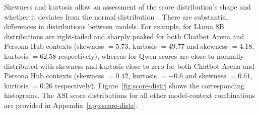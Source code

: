 \documentclass{DESSThesis}
\begin{document}
Skewness and kurtosis allow an assessment of the score distribution's shape and whether it deviates from the normal distribution~\cite{moosbrugger_testtheorie_2020}. There are substantial differences in distributions between models. For example, for Llama 8B distributions are right-tailed and sharply peaked for both Chatbot Arena and Persona Hub contexts (skewness $= 5.73$, kurtosis $= 49.77$ and skewness $= 4.18$, kurtosis $= 62.58$ respectively), whereas for Qwen scores are close to normally distributed with skewness and kurtosis close to zero for both Chatbot Arena and Persona Hub contexts (skewness $= 0.42$, kurtosis $= -0.6$ and skewness $= 0.61$, kurtosis $= 0.26$ respectively).
Figure~\ref{fig:score-distr} shows the corresponding histograms. The ASI score distributions for all other model-context combinations are provided in Appendix~\ref{app:score-distr}.


\end{document}
